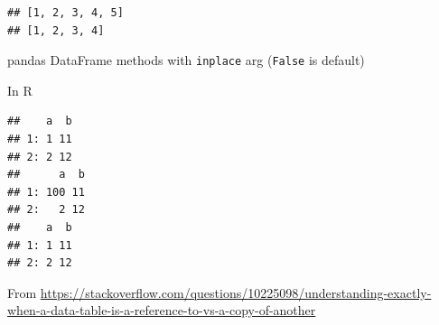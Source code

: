 \documentclass[
]{krantz}
\makeatletter
\newenvironment{Shaded}{\begin{snugshade}}{\end{snugshade}}
\newcommand{\AttributeTok}[1]{\textcolor[rgb]{0.61,0.61,0.61}{#1}}
\newcommand{\CommentTok}[1]{\textcolor[rgb]{0.37,0.37,0.37}{\textit{#1}}}
\newcommand{\DecValTok}[1]{\textcolor[rgb]{0.06,0.06,0.06}{#1}}
\newcommand{\ErrorTok}[1]{\textcolor[rgb]{0.14,0.14,0.14}{\textbf{#1}}}
\newcommand{\FunctionTok}[1]{\textcolor[rgb]{0,0,0}{#1}}
\newcommand{\NormalTok}[1]{#1}
\newcommand{\OtherTok}[1]{\textcolor[rgb]{0.37,0.37,0.37}{#1}}
\newcommand{\SpecialCharTok}[1]{\textcolor[rgb]{0,0,0}{#1}}
\newenvironment{kframe}{%
\medskip{}
\setlength{\fboxsep}{.8em}
 \def\at@end@of@kframe{}%
 \ifinner\ifhmode%
  \def\at@end@of@kframe{\end{minipage}}%
  \begin{minipage}{\columnwidth}%
 \fi\fi%
 \def\FrameCommand##1{\hskip\@totalleftmargin \hskip-\fboxsep
 \colorbox{shadecolor}{##1}\hskip-\fboxsep
     \hskip-\linewidth \hskip-\@totalleftmargin \hskip\columnwidth}%
 \MakeFramed {\advance\hsize-\width
   \@totalleftmargin\z@ \linewidth\hsize
   \@setminipage}}%
 {\par\unskip\endMakeFramed%
 \at@end@of@kframe}
\renewenvironment{Shaded}{\begin{kframe}}{\end{kframe}}
\makeatother
\begin{document}
\begin{verbatim}
## [1, 2, 3, 4, 5]
## [1, 2, 3, 4]
\end{verbatim}

pandas DataFrame methods with \texttt{inplace} arg (\texttt{False} is default)

In R

\begin{Shaded}
\end{Shaded}

\begin{verbatim}
##    a  b
## 1: 1 11
## 2: 2 12
##      a  b
## 1: 100 11
## 2:   2 12
##    a  b
## 1: 1 11
## 2: 2 12
\end{verbatim}

From \url{https://stackoverflow.com/questions/10225098/understanding-exactly-when-a-data-table-is-a-reference-to-vs-a-copy-of-another}
\end{document}
